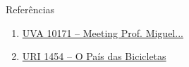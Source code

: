 \begin{frame}[fragile]{Referências}

    \begin{enumerate}
        \item \href{https://uva.onlinejudge.org/index.php?option=com_onlinejudge&Itemid=8&category=24&page=show_problem&problem=1112}{UVA 10171 -- Meeting Prof. Miguel...}

        \item \href{https://www.urionlinejudge.com.br/judge/pt/problems/view/1454}{URI 1454 -- O País das Bicicletas}

    \end{enumerate}

\end{frame}

